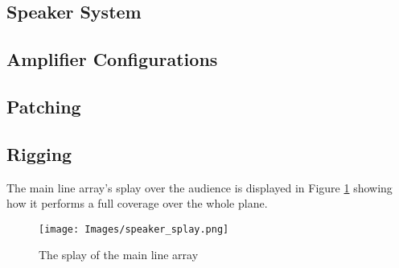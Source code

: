 \documentclass{BCUReport}
\begin{document}
\clearpage



\newpage
{}




\begin{appendices}
    \section{Speaker System} 
    
        \subsection{Amplifier Configurations}
            \label{appendix:speaker_amp_config}
            
    
        \subsection{Patching}
            \label{appendix:speaker_patch}
            
        
        \subsection{Rigging}
            The main line array's splay over the audience is displayed in Figure \ref{fig:speaker_splay} showing how it performs a full coverage over the whole plane.
    
            \begin{figure}[H]
                \centering
                \texttt{[image: Images/speaker\_splay.png]}
                \caption{The splay of the main line array}
                \label{fig:speaker_splay}
            \end{figure}
            

\end{appendices}
\end{document}
